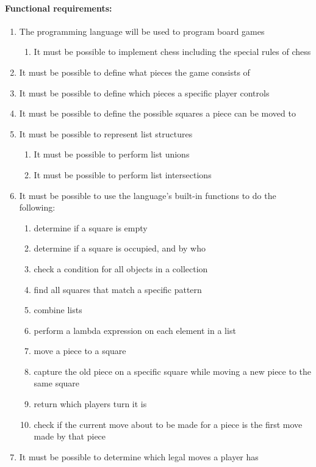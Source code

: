 \paragraph*{Functional requirements:}
\begin{enumerate}
  \item The programming language will be used to program board games
  \begin{enumerate}
    \item It must be possible to implement chess including the special rules of chess
  \end{enumerate}
  \item It must be possible to define what pieces the game consists of
  \item It must be possible to define which pieces a specific player controls
  \item It must be possible to define the possible squares a piece can be moved to
  \item It must be possible to represent list structures
  \begin{enumerate}
    \item It must be possible to perform list unions
    \item It must be possible to perform list intersections
  \end{enumerate}
  \item It must be possible to use the language’s built-in functions to do the following:
  \begin{enumerate}
    \item determine if a square is empty
    \item determine if a square is occupied, and by who
    \item check a condition for all objects in a collection
    \item find all squares that match a specific pattern
    \item combine lists
    \item perform a lambda expression on each element in a list
    \item move a piece to a square
    \item capture the old piece on a specific square while moving a new piece to the same square
    \item return which players turn it is
    \item check if the current move about to be made for a piece is the first move made by that piece
  \end{enumerate}
  \item It must be possible to determine which legal moves a player has

\end{enumerate}
